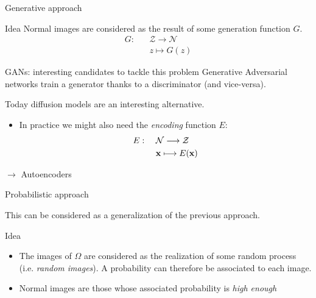 \documentclass[xcolor=pdftex,dvipsnames,table,mathserif,aspectratio=169]{beamer}
\begin{document}
\begin{frame}{Generative approach}

  \begin{block}{Idea}
    Normal images are considered as the result of some generation function $G$.
    \[
    \begin{split}
    G: & ~~~~\mathcal{Z} \longrightarrow \mathcal{N} \\
    & ~~~~ z \longmapsto G(z)
    \end{split}
    \]
  \end{block}

  \begin{alertblock}{GANs: interesting candidates to tackle this problem}
    Generative Adversarial networks train a \alert{generator} thanks to a \alert{discriminator} (and vice-versa).
  \end{alertblock}
  Today diffusion models are an interesting alternative.

\pause

\begin{itemize}
\item In practice we might also need the \emph{encoding} function $E$:
    \[
    \begin{split}
    E: & ~~~~\mathcal{N} \longrightarrow \mathcal{Z} \\
    & ~~~~ \mathbf{x} \longmapsto E(\mathbf{x})
    \end{split}
    \]
\end{itemize}

\begin{alertblock}{}
  $\longrightarrow$ Autoencoders
\end{alertblock}

\end{frame}


\begin{frame}{Probabilistic approach}

This can be considered as a generalization of the previous approach.

\begin{block}{Idea}

  \begin{itemize}
  \item   The images of $\Omega$ are considered as the realization of some random process (i.e. \emph{random images}). A probability can therefore be associated to each image.
  \item Normal images are those whose associated probability is \emph{high enough}
  \end{itemize}

\end{block}



\end{frame}
\end{document}
